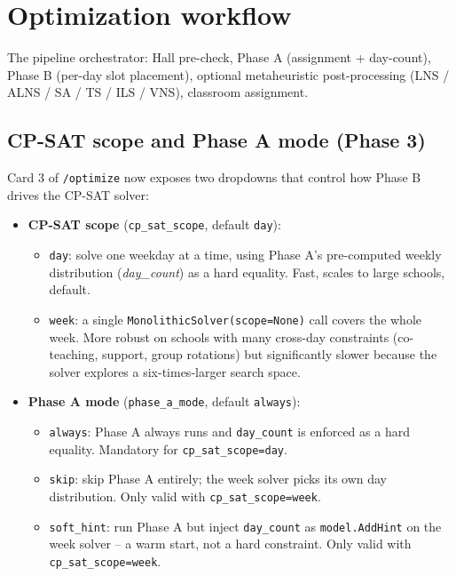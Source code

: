 \chapter{Optimization workflow}
\label{ch:workflow_di_ottimizzazione_en}

The pipeline orchestrator: Hall pre-check, Phase A (assignment + day-count), Phase B (per-day slot placement), optional metaheuristic post-processing (LNS / ALNS / SA / TS / ILS / VNS), classroom assignment.

\section*{CP-SAT scope and Phase A mode (Phase 3)}

Card 3 of \texttt{/optimize} now exposes two dropdowns that control how Phase B drives the CP-SAT solver:

\begin{itemize}
  \item \textbf{CP-SAT scope} (\texttt{cp\_sat\_scope}, default \texttt{day}):
        \begin{itemize}
          \item \texttt{day}: solve one weekday at a time, using Phase A's pre-computed weekly distribution (\emph{day\_count}) as a hard equality. Fast, scales to large schools, default.
          \item \texttt{week}: a single \texttt{MonolithicSolver(scope=None)} call covers the whole week. More robust on schools with many cross-day constraints (co-teaching, support, group rotations) but significantly slower because the solver explores a six-times-larger search space.
        \end{itemize}
  \item \textbf{Phase A mode} (\texttt{phase\_a\_mode}, default \texttt{always}):
        \begin{itemize}
          \item \texttt{always}: Phase A always runs and \texttt{day\_count} is enforced as a hard equality. Mandatory for \texttt{cp\_sat\_scope=day}.
          \item \texttt{skip}: skip Phase A entirely; the week solver picks its own day distribution. Only valid with \texttt{cp\_sat\_scope=week}.
          \item \texttt{soft\_hint}: run Phase A but inject \texttt{day\_count} as \texttt{model.AddHint} on the week solver -- a warm start, not a hard constraint. Only valid with \texttt{cp\_sat\_scope=week}.
        \end{itemize}
\end{itemize}

